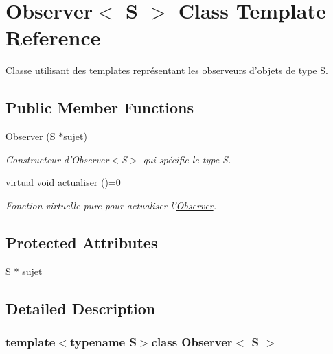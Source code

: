 \hypertarget{classObserver}{\section{Observer$<$ S $>$ Class Template Reference}
\label{classObserver}
}


Classe utilisant des templates représentant les observeurs d'objets de type S.  


\subsection*{Public Member Functions}
\begin{DoxyCompactItemize}
\item 
\hyperlink{classObserver_a4e0616c71c07fffc4c12bd1f7a746f3f}{Observer} (S $\ast$sujet)
\begin{DoxyCompactList}\small\item\em Constructeur d'Observer$<$\-S$>$ qui spécifie le type S. \end{DoxyCompactList}\item 
\hypertarget{classObserver_a3c821fc098d9e4b75ed4862a4a1bcb90}{virtual void \hyperlink{classObserver_a3c821fc098d9e4b75ed4862a4a1bcb90}{actualiser} ()=0}\label{classObserver_a3c821fc098d9e4b75ed4862a4a1bcb90}

\begin{DoxyCompactList}\small\item\em Fonction virtuelle pure pour actualiser l'\hyperlink{classObserver}{Observer}. \end{DoxyCompactList}\end{DoxyCompactItemize}
\subsection*{Protected Attributes}
\begin{DoxyCompactItemize}
\item 
S $\ast$ \hyperlink{classObserver_aab17a2e6e994be6301255b9a72383644}{sujet\-\_\-}
\end{DoxyCompactItemize}


\subsection{Detailed Description}
\subsubsection*{template$<$typename S$>$class Observer$<$ S $>$}

